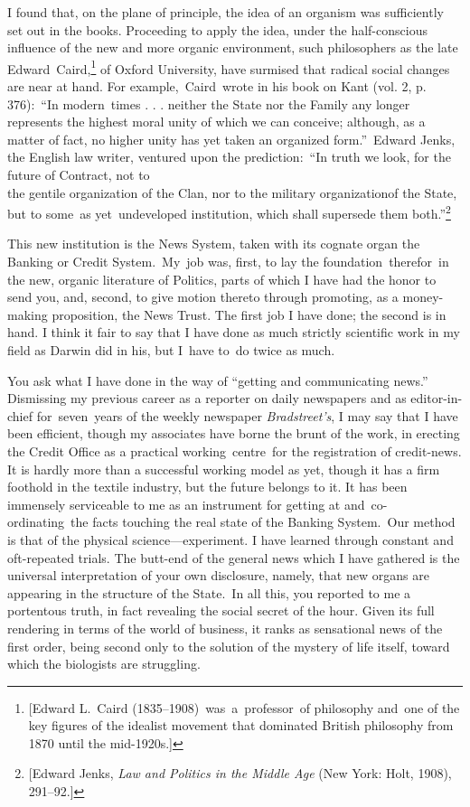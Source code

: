 \documentclass[openany,nobib]{tufte-book}
\begin{document}
I found that, on the plane of principle, the idea of an organism was
sufficiently set out in the books. Proceeding to apply the idea, under
the half-conscious influence of the new and more organic environment,
such philosophers as the late Edward~Caird,\footnote{{[}Edward L.~Caird
  (1835--1908)~was~a~professor~of philosophy and~one of the key figures
  of the idealist movement that dominated British philosophy from 1870
  until the mid-1920s.{]}} of Oxford University, have surmised that
radical social changes are near at hand. For example,~Caird~wrote in his
book on Kant (vol. 2, p. 376):~``In modern~times . . . neither the State
nor the Family any longer represents the highest moral unity of which we
can conceive; although, as a matter of fact, no higher unity has yet
taken an organized form.''~Edward Jenks, the English law writer,
ventured upon the prediction:~``In truth we look, for the future of
Contract, not to\\\noindent the gentile organization of the Clan, nor to the
military organization\newpage\noindent of the State, but to some~as yet~undeveloped
institution, which shall supersede them both.''\footnote{{[}Edward
  Jenks, \emph{Law and Politics in the Middle Age} (New York: Holt,
  1908), 291--92.{]}}

This new institution is the News System, taken with its cognate organ
the Banking or Credit System.~My~job was, first, to lay the
foundation~therefor~in the new, organic literature of Politics, parts of
which I have had the honor to send you, and, second, to give motion
thereto through promoting, as a money-making proposition, the News
Trust. The first job I have done; the second is in hand. I think it fair
to say that I have done as much strictly scientific work in my field as
Darwin did in his, but I~have to~do twice as much.~

You ask what I have done in the way of ``getting and communicating
news.'' Dismissing my previous career as a reporter on daily newspapers
and as editor-in-chief for~seven~years of the weekly newspaper
\emph{Bradstreet's}, I may say that I have been efficient, though my
associates have borne the brunt of the work, in erecting the Credit
Office as a practical working~centre~for the registration of
credit-news. It is hardly more than a successful working model as yet,
though it has a firm foothold in the textile industry, but the future
belongs to it. It has been immensely serviceable to me as an instrument
for getting at and~co-ordinating~the facts touching the real state of
the Banking System.~Our method is that of the physical
science---experiment. I have learned through constant and oft-repeated
trials. The butt-end of the general news which I have gathered is the
universal interpretation of your own disclosure, namely, that new organs
are appearing in the structure of the State.~In all this, you reported
to me a portentous truth, in fact revealing the social secret of the
hour. Given its full rendering in terms of the world of business, it
ranks as sensational news of the first order, being second only to the
solution of the mystery of life itself, toward which the biologists are
struggling.~
\end{document}
